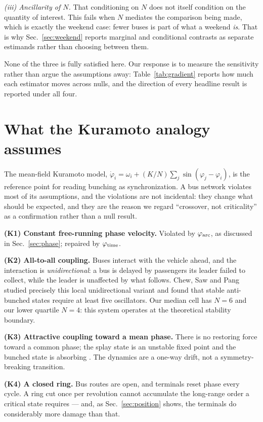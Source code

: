 \documentclass[9pt,twocolumn,twoside]{opticajnl}
\begin{document}
\emph{(iii) Ancillarity of $N$.} That conditioning on $N$ does not itself condition on the
quantity of interest. This fails when $N$ mediates the comparison being made, which is exactly
the weekend case: fewer buses is part of what a weekend \emph{is}. That is why
Sec.~\ref{sec:weekend} reports marginal and conditional contrasts as separate estimands rather
than choosing between them.

None of the three is fully satisfied here. Our response is to measure the sensitivity rather
than argue the assumptions away: Table~\ref{tab:gradient} reports how much each estimator moves
across nulls, and the direction of every headline result is reported under all four.

\section{What the Kuramoto analogy assumes}\label{sec:assump}

The mean-field Kuramoto model,
$\dot\varphi_i = \omega_i + (K/N)\sum_j \sin(\varphi_j - \varphi_i)$, is the reference point for
reading bunching as synchronization. A bus network violates most of its assumptions, and the
violations are not incidental: they change what should be expected, and they are the reason we
regard ``crossover, not criticality'' as a confirmation rather than a null result.

\textbf{(K1) Constant free-running phase velocity.} Violated by $\varphi_{\rm arc}$, as
discussed in Sec.~\ref{sec:phase}; repaired by $\varphi_{\rm time}$.

\textbf{(K2) All-to-all coupling.} Buses interact with the vehicle ahead, and the interaction is
\emph{unidirectional}: a bus is delayed by passengers its leader failed to collect, while the
leader is unaffected by what follows. Chew, Saw and Pang \cite{chew19} studied precisely this
local unidirectional variant and found that stable anti-bunched states require at least five
oscillators. Our median cell has $N = 6$ and our lower quartile $N = 4$: this system operates at
the theoretical stability boundary.

\textbf{(K3) Attractive coupling toward a mean phase.} There is no restoring force toward a
common phase; the splay state is an unstable fixed point and the bunched state is absorbing
\cite{gershenson09}. The dynamics are a one-way drift, not a symmetry-breaking transition.

\textbf{(K4) A closed ring.} Bus routes are open, and terminals reset phase every cycle. A ring
cut once per revolution cannot accumulate the long-range order a critical state requires ---
and, as Sec.~\ref{sec:position} shows, the terminals do considerably more damage than that.
\end{document}
